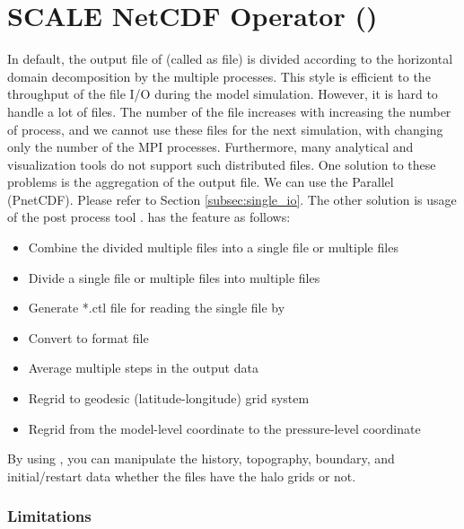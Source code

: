 \section{SCALE NetCDF Operator (\sno)} \label{sec:sno}

In default, the output file of \scalerm (called as \scalenetcdf file) is divided according to the horizontal domain decomposition by the multiple processes. This style is efficient to the throughput of the file I/O during the model simulation. However, it is hard to handle a lot of files. The number of the file increases with increasing the number of process, and we cannot use these files for the next simulation, with changing only the number of the MPI processes. Furthermore, many analytical and visualization tools do not support such distributed files. One solution to these problems is the aggregation of the output file. We can use the Parallel \netcdf (PnetCDF). Please refer to Section \ref{subsec:single_io}. The other solution is usage of the post process tool \sno. \sno has the feature as follows:

\begin{itemize}
 \item Combine the divided multiple files into a single file or multiple files
 \item Divide a single file or multiple files into multiple files
 \item Generate *.ctl file for reading the single \Netcdf file by \grads
 \item Convert to \grads format file
 \item Average multiple steps in the output data
 \item Regrid to geodesic (latitude-longitude) grid system
 \item Regrid from the model-level coordinate to the pressure-level coordinate
\end{itemize}

By using \sno, you can manipulate the history, topography, boundary, and initial/restart data whether the files have the halo grids or not.

\subsubsection{Limitations}

